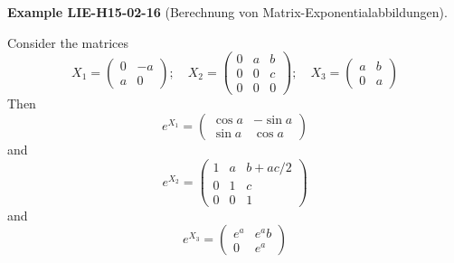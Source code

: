\documentclass[10pt, letterpaper]{article}
\newcommand{\CustomHeading}[3]{%
  \par\medskip\noindent%
  \textbf{#1 #2} \textnormal{(#3)}.\enskip%
}
\newenvironment{EXA}[2]{\CustomHeading{Example}{#1}{#2}}{}
\begin{document}
\begin{EXA}{LIE-H15-02-16}{Berechnung von Matrix-Exponentialabbildungen}
Consider the matrices
$$
X_{1}=\left(\begin{array}{rr}
0 & -a \\
a & 0
\end{array}\right) ; \quad X_{2}=\left(\begin{array}{ccc}
0 & a & b \\
0 & 0 & c \\
0 & 0 & 0
\end{array}\right) ; \quad X_{3}=\left(\begin{array}{cc}
a & b \\
0 & a
\end{array}\right)
$$
Then
$$
e^{X_{1}}=\left(\begin{array}{rr}
\cos a & -\sin a \\
\sin a & \cos a
\end{array}\right)
$$
and
$$
e^{X_{2}}=\left(\begin{array}{ccc}
1 & a & b+a c / 2 \\
0 & 1 & c \\
0 & 0 & 1
\end{array}\right)
$$
and
$$
e^{X_{3}}=\left(\begin{array}{cc}
e^{a} & e^{a} b \\
0 & e^{a}
\end{array}\right)
$$


\end{EXA}
\end{document}
